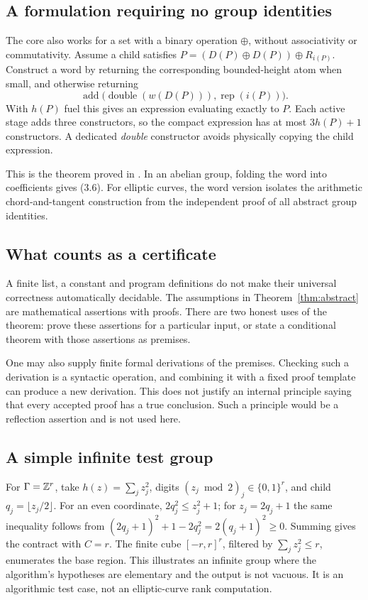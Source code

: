 \subsection{A formulation requiring no group identities}

The core also works for a set with a binary operation $\oplus$, without
associativity or commutativity. Assume a child satisfies
$P=(D(P)\oplus D(P))\oplus R_{i(P)}$.
Construct a word by returning the corresponding bounded-height atom when
small, and otherwise returning
\[
 \operatorname{add}\bigl(\operatorname{double}(w(D(P))),
                         \operatorname{rep}(i(P))\bigr).
 \tag{3.7}
\]
With $h(P)$ fuel this gives an expression evaluating exactly to $P$.
Each active stage adds three constructors, so the compact expression has
at most $3h(P)+1$ constructors. A dedicated \emph{double} constructor
avoids physically copying the child expression.

This is the theorem proved in . In an abelian
group, folding the word into coefficients gives (3.6). For elliptic curves,
the word version isolates the arithmetic chord-and-tangent construction
from the independent proof of all abstract group identities.

\subsection{What counts as a certificate}

A finite list, a constant and program definitions do not make their
universal correctness automatically decidable. The assumptions in
Theorem~\ref{thm:abstract} are mathematical assertions with proofs.
There are two honest uses of the theorem: prove these assertions for a
particular input, or state a conditional theorem with those assertions as
premises.

One may also supply finite formal derivations of the premises. Checking
such a derivation is a syntactic operation, and combining it with a fixed
proof template can produce a new derivation. This does not justify an
internal principle saying that every accepted proof has a true conclusion.
Such a principle would be a reflection assertion and is not used here.

\subsection{A simple infinite test group}

For $\Gamma=\mathbb Z^r$, take $h(z)=\sum_j z_j^2$, digits
$(z_j\bmod2)_j\in\{0,1\}^r$, and child
$q_j=\lfloor z_j/2\rfloor$. For an even coordinate,
$2q_j^2\le z_j^2+1$; for $z_j=2q_j+1$ the same inequality follows from
$(2q_j+1)^2+1-2q_j^2=2(q_j+1)^2\ge0$. Summing gives the contract
with $C=r$. The finite cube $[-r,r]^r$, filtered by $\sum_jz_j^2\le r$,
enumerates the base region. This illustrates an infinite group where the
algorithm's hypotheses are elementary and the output is not vacuous.
It is an algorithmic test case, not an elliptic-curve rank computation.
